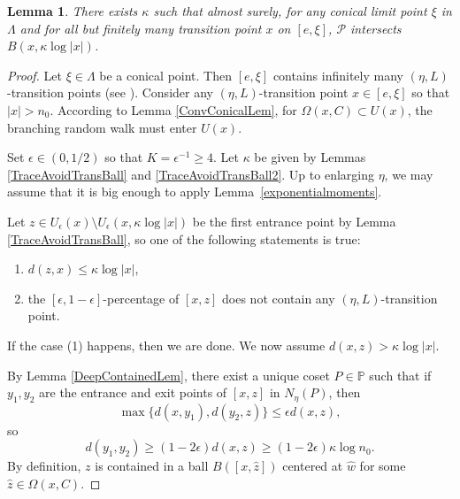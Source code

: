 \documentclass{amsart}
\newtheorem{lem}[thm]{Lemma}
\theoremstyle{definition}
\theoremstyle{remark}
\newcommand{\diam }[1]{{\textbf{diam}\big(#1\big)}}
\begin{document}
\begin{lem}\label{LogTrackingLem}
There exists $\kappa$ such that almost surely,   for any conical limit  point $\xi$ in $\Lambda$
and {for all but finitely many transition point $x$ on $[e,\xi]$, $\mathcal{P}$ intersects $B(x,\kappa \log |x|)$.}
\end{lem}
\begin{proof}
Let  $\xi\in \Lambda$  be a conical point. Then $[e,\xi]$ contains infinitely many $(\eta, L)$-transition points (see  \cite[Lemma 2.20]{YangPS}). Consider any  $(\eta, L)$-transition point $x\in [e,\xi]$ so that $|x|>n_0$. According to  Lemma \ref{ConvConicalLem}, for $\Omega(x,C)\subset U(x)$, the branching random walk must enter $  U(x)$.  

Set $\epsilon\in (0,1/2)$ so that $K=\epsilon^{-1}\ge 4$.  Let $\kappa$ be given by Lemmas \ref{TraceAvoidTransBall} and \ref{TraceAvoidTransBall2}.  Up to enlarging $\eta$, we may assume that it is big enough to apply Lemma~\ref{exponentialmoments}.

Let $z\in U_\epsilon(x)\setminus U_{\epsilon}(x,\kappa \log |x|)$ be the first entrance point by Lemma \ref{TraceAvoidTransBall}, so one of  the following statements is true:
\begin{enumerate}
    \item 
      $d(z, x)\le  \kappa \log |x|$,  
    \item
    the $[\epsilon, 1-\epsilon]$-percentage  of $[x,z]$ does not contain any $(\eta,L)$-transition point.  
\end{enumerate}

 

If the case (1) happens, then  we are done. We now assume     $d(x,z)>\kappa \log |x|$. 

By Lemma \ref{DeepContainedLem}, there exist a unique   coset $P\in \mathbb P$ such that if $y_1,y_2$ are the entrance and exit points of  $[x,z]$ in $N_\eta(P)$, then
$$\max\{d(x,y_1), d(y_2,z)\}\le \epsilon d(x,z),$$
so
$$d(y_1,y_2)\geq (1-2\epsilon)d(x,z)\ge (1-2\epsilon) \kappa \log n_0.$$
By definition,   $z$ is contained in a ball $B([x,\hat z])$ centered at $\hat w$ for some $\hat z\in \Omega(x,C)$.




\end{proof}
\end{document}
